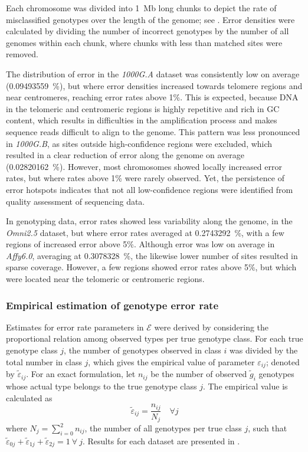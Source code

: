 Each chromosome was divided into 1~Mb long chunks to depict the rate of misclassified genotypes over the length of the genome; see .
Error densities were calculated by dividing the number of incorrect genotypes by the number of all genomes within each chunk, where chunks with less than  matched sites were removed.

%

%

The distribution of error in the \emph{1000G.A} dataset was consistently low on average (\SI{0.09493559}{\percent}), but where error densities increased towards telomere regions and near centromeres, reaching error rates above 1\%.
This is expected, because DNA in the telomeric and centromeric regions is highly repetitive and rich in GC content, which results in difficulties in the amplification process and makes sequence reads difficult to align to the genome.
This pattern was less pronounced in \emph{1000G.B}, as sites outside high-confidence regions were excluded, which resulted in a clear reduction of error along the genome on average (\SI{0.02820162}{\percent}).
However, most chromosomes showed locally increased error rates, but where rates above 1\% were rarely observed.
Yet, the persistence of error hotspots indicates that not all low-confidence regions were identified from quality assessment of sequencing data.

In genotyping data, error rates showed less variability along the genome, \eg in the \emph{Omni2.5} dataset, but where error rates averaged at \SI{0.2743292}{\percent}, with a few regions of increased error above 5\%.
Although error was low on average in \emph{Affy6.0}, averaging at \SI{0.3078328}{\percent}, the likewise lower number of sites resulted in sparse coverage.
However, a few regions showed error rates above 5\%, but which were located near the telomeric or centromeric regions.


%
\subsubsection{Empirical estimation of genotype error rate}
%

Estimates for error rate parameters in $\mathcal{E}$ were derived by considering the proportional relation among observed types per true genotype class.
For each true genotype class $j$, the number of genotypes observed in class $i$ was divided by the total number in class $j$, which gives the empirical value of parameter $\varepsilon_{ij}$; denoted by $\tilde{\varepsilon}_{ij}$.
For an exact formulation, let $n_{ij}$ be the number of observed $\tilde{g}_i$ genotypes whose actual type belongs to the true genotype class $j$.
The empirical value is calculated as
\begin{equation}\label{eq:empexperr}
	\tilde{\varepsilon}_{ij} = \frac{n_{ij}}{N_j} \quad \forall j
\end{equation}
where ${N_j = \sum^{2}_{i=0} n_{ij}}$, \ie the number of all genotypes per true class $j$, such that ${\tilde{\varepsilon}_{0j} + \tilde{\varepsilon}_{1j} + \tilde{\varepsilon}_{2j} = 1 \ \forall \ j}$.
Results for each dataset are presented in .

